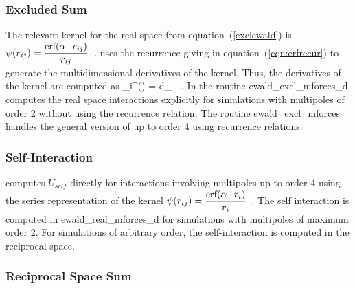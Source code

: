 \subsubsection*{Excluded Sum}

The relevant kernel for the real space from equation~(\ref{exclewald}) is
$\displaystyle \psi(r_{ij}) = \frac{\textrm{erf}(\alpha \cdot r_{ij})}{r_{ij}}$~.
\D uses the recurrence giving in equation~(\ref{eqn:erfrecur}) to generate
the multidimensional derivatives of the kernel.  Thus, the derivatives of
the kernel are computed as
\beq
\bd_i^{\bs}\psi(\rij) = d_{\bs}~~.
\eeq
\noindent
In \D the routine {\sc ewald\_excl\_mforces\_d} computes the real space
interactions explicitly for simulations with multipoles of order 2 without
using the recurrence relation.  The routine {\sc ewald\_excl\_mforces}
handles the general version of up to order 4 using recurrence relations.

\subsubsection*{Self-Interaction}

\D computes $U_{self}$ directly for interactions involving multipoles up
to order 4 using the series representation of the kernel
$\displaystyle \psi(r_{ij}) = \frac{\textrm{erf}(\alpha \cdot r_i)}{r_i}$~.
The self interaction is computed in {\sc ewald\_real\_mforces\_d} for
simulations with multipoles of maximum order 2.  For simulations of
arbitrary order, the self-interaction is computed in the reciprocal space.

\subsubsection*{Reciprocal Space Sum}

